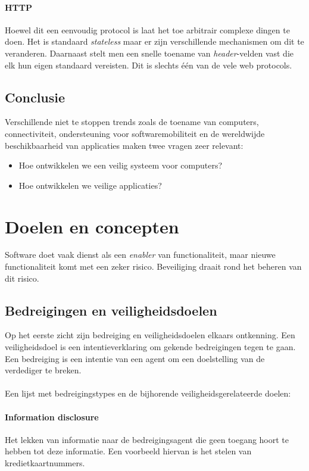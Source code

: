 \documentclass[../main.tex]{subfiles}
\begin{document}
\paragraph{HTTP} Hoewel dit een eenvoudig protocol is laat het toe arbitrair complexe dingen te doen. Het is standaard \textit{stateless} maar er zijn verschillende mechanismen om dit te veranderen. Daarnaast stelt men een snelle toename van \textit{header}-velden vast die elk hun eigen standaard vereisten. Dit is slechts \'e\'en van de vele web protocols.

\subsection{Conclusie}
Verschillende niet te stoppen trends zoals de toename van computers, connectiviteit, ondersteuning voor softwaremobiliteit en de wereldwijde beschikbaarheid van applicaties maken twee vragen zeer relevant:
\begin{itemize}
	\item Hoe ontwikkelen we een veilig systeem voor computers?
	\item Hoe ontwikkelen we veilige applicaties?
\end{itemize}

\section{Doelen en concepten}
Software doet vaak dienst als een \textit{enabler} van functionaliteit, maar nieuwe functionaliteit komt met een zeker risico. Beveiliging draait rond het beheren van dit risico.
\subsection{Bedreigingen en veiligheidsdoelen}
Op het eerste zicht zijn bedreiging en veiligheidsdoelen elkaars ontkenning.
Een veiligheidsdoel is een intentieverklaring om gekende bedreigingen tegen te gaan.
Een bedreiging is een intentie van een agent om een doelstelling van de verdediger te breken.
\\\\
Een lijst met bedreigingstypes en de bijhorende veiligheidsgerelateerde doelen:

\paragraph{Information disclosure}
Het lekken van informatie naar de bedreigingsagent die geen toegang hoort te hebben tot deze informatie. Een voorbeeld hiervan is het stelen van kredietkaartnummers.
\end{document}
